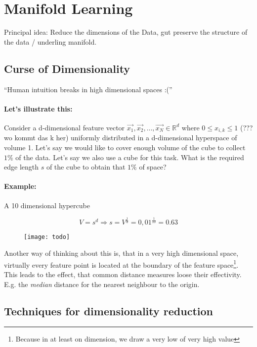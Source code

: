 
\section{Manifold Learning}
Principal idea: Reduce the dimensions of the Data, gut preserve the structure of the data / underling manifold.

\subsection{Curse of Dimensionality}
``Human intuition breaks in high dimensional spaces :(''

\paragraph{Let's illustrate this:}
Consider a d-dimensional feature vector $\vec{x_1}, \vec{x_2}, \dots, \vec{x_N} \in \mathbb{R}^d$ where $0 \le x_{i,k} \le 1$ (??? wo kommt das k her) uniformly distributed in a d-dimensional hyperspace of volume 1.
Let's say we would like to cover enough volume of  the cube to collect $1\%$ of the data. Let's say we also use a cube for this task. What is the required edge length $s$ of the cube to obtain that $1\%$ of space?

\paragraph{Example:}
A 10 dimensional hypercube

\begin{equation*}
    V=s^d \Rightarrow s = V^{\frac{1}{d}} = 0,01^{\frac{1}{10}} = 0.63
\end{equation*}

\begin{figure}[H]
	\centering
	\texttt{[image: todo]}
\end{figure}

Another way of thinking about this is, that in a very high dimensional space, virtually every feature point is located at the boundary of the feature space\footnote{Because in at least on dimension, we draw a very low of very high value}. This leads to the effect, that common distance measures loose their  effectivity. E.g. the \textit{median} distance for the nearest neighbour to the origin.

\subsection{Techniques for dimensionality reduction}
